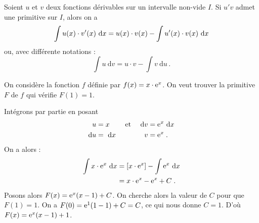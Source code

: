 	      \begin{thm}
	            Soient $u$ et $v$ deux fonctions d\'erivables sur un intervalle non-vide $I$.
	            Si $u'v$ admet une primitive sur $I$, alors on a 
	                  \begin{equation*}
	                        \int u(x) \cdot v'(x) ~\mathrm{d}x = u(x) \cdot v(x) - \int u'(x) \cdot v(x) ~\mathrm{d}x      
	                  \label{eq:IPP fonctions}
	                  \end{equation*}
	            ou, avec diff\'erente notations :
	                  \begin{equation*}
	                        \int u \ \mathrm{d}v = u \cdot v - \int v \ \mathrm{d}u      \,.
	                  \label{eq:IPP differentielles}
	                  \end{equation*}
	            \begin{ex}
	                  On consid\`ere la fonction $f$ d\'efinie par $f(x) = x\cdot \mathrm{e}^{x}$.
	                  On veut trouver la primitive $F$ de $f$ qui v\'erifie $F(1) = 1$.
	                  
	                  Int\'egrons par partie en posant
	                        \begin{align*}
	                              u           & = x       & \text{ et } & &      \mathrm{d}v & = \mathrm{e}^{x} ~\mathrm{d}x      \\
	                              \mathrm{d}u & = ~\mathrm{d}x     & \text{    } & &      v           & = \mathrm{e}^{x}          \;.
	                        \end{align*}
	                  On a alors :
	                        \begin{align*}
	                        \int x \cdot \mathrm{e}^{x} ~\mathrm{d}x & = [x \cdot \mathrm{e}^{x} ] - \int \mathrm{e}^{x} ~\mathrm{d}x       \\
	                                                  & = x \cdot \mathrm{e}^{x} - \mathrm{e}^{x} + C               \;.
	                        \end{align*}
	                  Posons alors $F(x) = \mathrm{e}^{x} (x-1) + C$.
	                  On cherche alors la valeur de $C$ pour que $F(1) = 1$.
	                  On a $
	                              F(0) = \mathrm{e}^{1} (1-1) + C = C
	                       $,
	                       ce qui nous donne $C = 1$.
	                  D'o\`u $F(x) = \mathrm{e}^{x} (x-1) + 1$.
	            \end{ex}
	      \end{thm}
